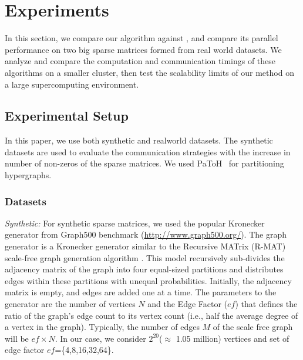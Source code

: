 \section{Experiments}
\label{sec:experiment}

\newcommand{\NLS}{LUC }
\newcommand{\krfaun}{\textbf{COL}\xspace}
\newcommand{\krcun}{\textbf{CN}\xspace}
\newcommand{\krcha}{\textbf{CH1}\xspace}
\newcommand{\krchb}{\textbf{CH2}\xspace}
\newcommand{\krcr}{\textbf{CR}\xspace}
\newcommand{\krfh}{\textbf{FH}\xspace}


In this section, we compare our algorithm \distspnmf against \mpifaun, and compare its parallel performance on two big sparse matrices formed from real world datasets.
We analyze and compare the computation and communication timings of these algorithms on a smaller cluster, then test the scalability limits of our method on a large supercomputing environment.

\subsection{Experimental Setup}
In this paper, we use both synthetic and realworld datasets. The synthetic datasets are used to evaluate the communication
 strategies with the increase in number of non-zeros of the sparse matrices. 
 We used PaToH~\cite{caay:99} for partitioning hypergraphs.
\subsubsection{Datasets}\label{sec:datasets}


{\em Synthetic:} For synthetic sparse matrices, we used the popular Kronecker generator from Graph500 benchmark (\url{http://www.graph500.org/}). The graph generator is a Kronecker generator similar to the Recursive MATrix (R-MAT) scale-free graph generation algorithm \cite{CZF04}. This model recursively sub-divides the adjacency matrix of the graph into four equal-sized partitions and distributes edges within these partitions with unequal probabilities. Initially, the adjacency matrix is empty, and edges are added one at a time. The parameters to the generator are the number of vertices $N$ and the Edge Factor ($ef$) that defines the ratio of the graph's edge count to its vertex count (i.e., half the average degree of a vertex in the graph). Typically, the number of edges $M$ of the scale free graph will be $ef \times N$. In our case, we consider $2^{20}$($\approx$ 1.05 million) vertices and set of edge factor $ef$=\{4,8,16,32,64\}.  

